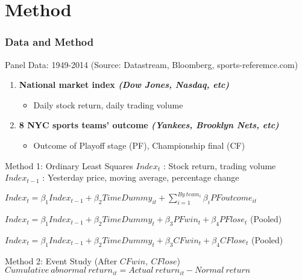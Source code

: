 \documentclass[]{beamer}
\begin{document}
\section{Method}
\begin{frame}
        \frametitle{Data and Method}

        \begin{block}{Panel Data: 1949-2014 
        \tiny{(Source: Datastream, Bloomberg, sports-referemce.com)}}
         \begin{enumerate}
             \item \textbf{\small{National market index} \textit{\tiny{(Dow Jones, Nasdaq, etc)}}}
             \begin{itemize}
             \tiny
                \item Daily stock return, daily trading volume
             \end{itemize}
             
             \item \textbf{\small{8 NYC sports teams' outcome} \textit{\tiny{(Yankees, Brooklyn Nets, etc)}}}
             \begin{itemize}
             \tiny
                 \item Outcome of Playoff stage (PF), Championship final (CF)
             \end{itemize}
         \end{enumerate}
        \end{block}
                
         \begin{block}{Method 1: Ordinary Least Squares}
         \tiny{$Index_t$ : Stock return, trading volume\\
                     $Index_{t-1}$ : Yesterday price, moving average, percentage change}
             \begin{enumerate}
              \small{
                \item $Index_t=\beta_1Index_{t-1}+\beta_2TimeDummy_{it}+\sum_{i=1}^{By\ team_i}\beta_iPFoutcome_{it}$
                 \item $Index_t=\beta_1Index_{t-1}+\beta_2TimeDummy_{t}+\beta_3PFwin_{t}+\beta_4PFlose_{t}$ \scriptsize{(Pooled)}\
                \item \small $Index_t=\beta_1Index_{t-1}+\beta_2TimeDummy_{t}+\beta_3CFwin_{t}+\beta_4CFlose_{t}$ \scriptsize{(Pooled)}}
             \end{enumerate}
             \end{block}

        \begin{block}{\normalsize{Method 2: Event Study \small{(After $CFwin,\ CFlose$)}}}
        \small{
        $Cumulative\ abnormal\ return_{it}=Actual\ return_{it}-Normal\ return$
        }
        \end{block}
    
\end{frame}
\end{document}
